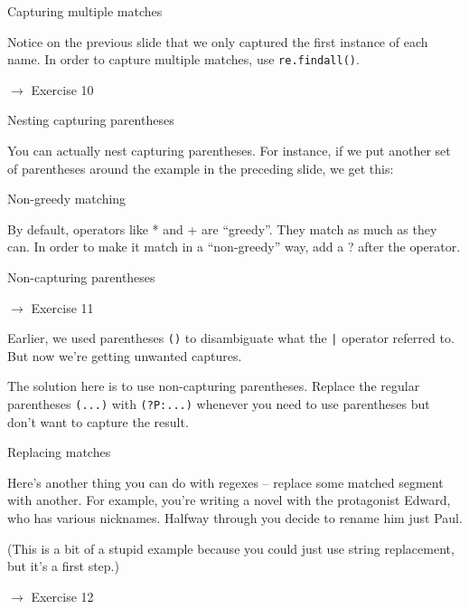 \documentclass{beamer}
\begin{document}
\begin{frame}{Capturing multiple matches}

Notice on the previous slide that we only captured the first instance of each name.
In order to capture multiple matches, use \lstinline$re.findall()$.



$\rightarrow$ Exercise 10

\end{frame}

\begin{frame}{Nesting capturing parentheses}

You can actually nest capturing parentheses. For instance, if we put
another set of parentheses around the example in the preceding slide, 
we get this:

\bigskip



\end{frame}


\begin{frame}{Non-greedy matching}

By default, operators like * and + are ``greedy''. They match as much
as they can. In order to make it match in a ``non-greedy'' way, add a ?
after the operator.



\end{frame}

\begin{frame}{Non-capturing parentheses}

$\rightarrow$ Exercise 11

\bigskip

Earlier, we used parentheses  \lstinline$()$ to disambiguate what the \lstinline$|$ operator
referred to. But now we're getting unwanted captures.

\bigskip

The solution here is to use non-capturing parentheses. Replace the regular 
parentheses  \lstinline$(...)$ with  \lstinline$(?P:...)$ whenever you
need to use parentheses but don't want to capture the result.

\end{frame}

\begin{frame}{Replacing matches}

Here's another thing you can do with regexes -- replace some matched segment
with another. For example, you're writing a novel with the protagonist Edward,
who has various nicknames. Halfway through you decide to rename him just Paul.



(This is a bit of a stupid example because you could just use string replacement,
but it's a first step.)

\bigskip

$\rightarrow$ Exercise 12

\end{frame} 
\end{document}
